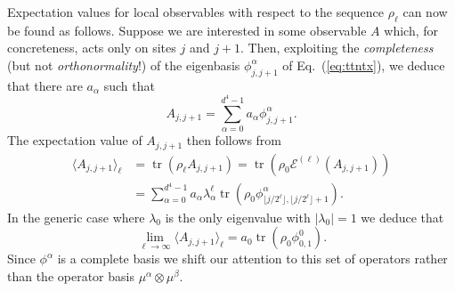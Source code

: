 \documentclass[prl,twocolumn,lengthcheck,superscriptaddress]{revtex4-1}
\newcommand{\tr}{\operatorname{tr}}
\theoremstyle{definition}
\theoremstyle{remark}
\begin{document}
Expectation values for local observables with respect to the sequence $\rho_{\ell}$ can now be found as follows. Suppose we are interested in some observable $A$ which, for concreteness, acts only on sites $j$ and $j+1$. Then, exploiting the \emph{completeness} (but not \emph{orthonormality}!) of the eigenbasis $\phi^\alpha_{j,j+1}$ of Eq.~(\ref{eq:ttntx}), we deduce that there are $a_\alpha$ such that
\begin{equation}
	A_{j,j+1} = \sum_{\alpha=0}^{d^4-1} a_\alpha \phi^\alpha_{j,j+1}.
\end{equation}
The expectation value of $A_{j,j+1}$ then follows from
\begin{equation}
	\begin{split}
		\langle A_{j,j+1} \rangle_{\ell} &= \tr(\rho_{\ell} A_{j,j+1}) = \tr(\rho_0 \mathcal{E}^{(\ell)}(A_{j,j+1})) \\
		&= \sum_{\alpha=0}^{d^4-1} a_\alpha \lambda_{\alpha}^\ell \tr(\rho_0\phi^\alpha_{\lfloor j/2^\ell \rfloor, \lfloor j/2^\ell \rfloor+1}).
	\end{split}
\end{equation}
In the generic case where $\lambda_0$ is the only eigenvalue with $|\lambda_0| = 1$ we deduce that 
\begin{equation}
	\lim_{\ell\rightarrow \infty}\langle A_{j,j+1} \rangle_{\ell}  =  a_0\tr(\rho_0\phi^0_{0,1}).
\end{equation}
Since $\phi^\alpha$ is a complete basis we shift our attention to this set of operators rather than the operator basis $\mu^\alpha\otimes \mu^\beta$.
\end{document}
